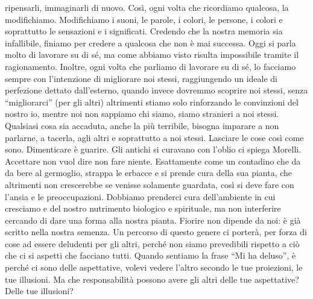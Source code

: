\documentclass[12pt]{book} %
\begin{document}
ripensarli, immaginarli di nuovo. Così, ogni volta che ricordiamo qualcosa, la modifichiamo. Modifichiamo i suoni, le
parole, i colori, le persone, i colori e soprattutto le sensazioni e i significati. Credendo che la nostra memoria sia
infallibile, finiamo per credere a qualcosa che non è mai successa. Oggi si parla molto di lavorare su di sé, ma come
abbiamo visto risulta impossibile tramite il ragionamento. Inoltre, ogni volta che parliamo di lavorare su di sé, lo
facciamo sempre con l'intenzione di migliorare noi stessi, raggiungendo un ideale di perfezione
dettato dall'esterno, quando invece dovremmo scoprire noi stessi, senza “migliorarci” (per gli altri) altrimenti stiamo
solo rinforzando le convinzioni del nostro io, mentre noi non sappiamo chi siamo, siamo stranieri a noi stessi.
Qualsiasi cosa sia accaduta, anche la più terribile, bisogna imparare a non parlarne, a tacerla, agli altri e
soprattutto a noi stessi. Lasciare le cose così come sono. Dimenticare è guarire. Gli antichi si curavano con
l'oblio ci spiega Morelli. Accettare non vuol dire non fare niente. Esattamente come un contadino
che da da bere al germoglio, strappa le erbacce e si prende cura della sua pianta, che altrimenti non crescerebbe se
venisse solamente guardata, così si deve fare con l'ansia e le preoccupazioni. Dobbiamo prenderci cura
dell'ambiente in cui cresciamo e del nostro nutrimento biologico e spirituale, ma non interferire
cercando di dare una forma alla nostra pianta. Fiorire non dipende da noi: è già scritto nella nostra semenza. Un
percorso di questo genere ci porterà, per forza di cose ad essere deludenti per gli altri, perché non siamo prevedibili
rispetto a ciò che ci si aspetti che facciano tutti. Quando sentiamo la frase “Mi ha deluso”, è perché ci sono delle
aspettative, volevi vedere l'altro secondo le tue proiezioni, le tue illusioni. Ma che
responsabilità possono avere gli altri delle tue aspettative? Delle tue illusioni?
\end{document}
